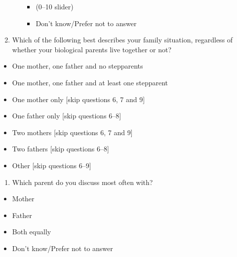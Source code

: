 \documentclass[
  letterpaper,
  DIV=11,
  numbers=noendperiod]{scrreprt}
\providecommand{\tightlist}{%
  \setlength{\itemsep}{0pt}\setlength{\parskip}{0pt}}\usepackage{longtable,booktabs,array}
\begin{document}
\begin{enumerate}
\begin{itemize}
    \begin{itemize}
    \tightlist
    \item
      (0--10 slider)
    \item
      Don't know/Prefer not to answer
    \end{itemize}
  \end{itemize}
\item
  Which of the following best describes your family situation,
  regardless of whether your biological parents live together or not?
\end{enumerate}

\begin{itemize}
\tightlist
\item
  One mother, one father and no stepparents
\item
  One mother, one father and at least one stepparent
\item
  One mother only {[}skip questions 6, 7 and 9{]}
\item
  One father only {[}skip questions 6--8{]}
\item
  Two mothers {[}skip questions 6, 7 and 9{]}
\item
  Two fathers {[}skip questions 6--8{]}
\item
  Other {[}skip questions 6--9{]}
\end{itemize}

\begin{enumerate}
\def\labelenumi{\arabic{enumi}.}
\setcounter{enumi}{5}
\tightlist
\item
  Which parent do you discuss most often with?
\end{enumerate}

\begin{itemize}
\tightlist
\item
  Mother
\item
  Father
\item
  Both equally
\item
  Don't know/Prefer not to answer
\end{itemize}
\end{document}
